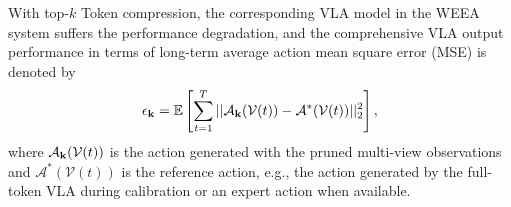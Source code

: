 \documentclass[lettersize,journal]{IEEEtran}
\theoremstyle{custom}
\begin{document}
With top-$k$ Token compression, the corresponding VLA model in the WEEA system suffers the performance degradation, and the comprehensive VLA output performance in terms of long-term average action mean square error (MSE) \cite{} is denoted by 
\begin{align}
    \epsilon_{\bf k} = \mathbb{E} \left[\sum_{t = 1}^T\vert\vert \mathcal{A}_{\bf k}(\mathcal{V}(t)) - \mathcal{A}^*(\mathcal{V}(t)) \vert\vert^2_2\right], 
\end{align}
where $\mathcal{A}_{\bf k}(\mathcal{V}(t))$ is the action generated with the pruned multi-view observations and $\mathcal{A}^*(\mathcal{V}(t))$ is the reference action, e.g., the action generated by the full-token VLA during calibration or an expert action when available. 



\end{document}
